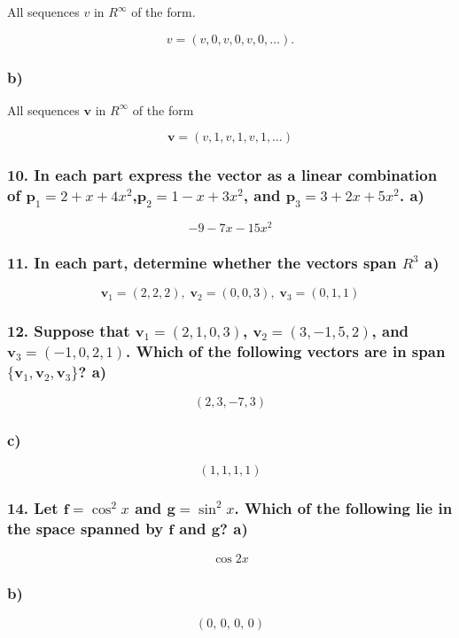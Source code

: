 \documentclass{article}
\begin{document}
All sequences $v$ in $R^{\infty}$ of the form.

\[ v = (v, 0, v, 0, v, 0, \ldots). \]
\vfill

\subsubsection*{ b) }

All sequences $\mathbf{v}$ in $R^{\infty}$ of the form

\[ \mathbf{v} = (v, 1, v, 1, v, 1, \ldots) \]
\vfill

\pagebreak
\subsubsection*{ 10. In each part express the vector as a linear combination of $\mathbf{p}_1 = 2 + x + 4x^2$,$ \mathbf{p}_2 = 1 - x + 3x^2$, and $\mathbf{p}_3 = 3 + 2x + 5x^2$. a) }

\[ -9-7x-15x^2 \]
\vfill

\subsubsection*{ 11. In each part, determine whether the vectors span $R^3$ a) }

\[ \mathbf{v}_1=(2,2,2),\; \mathbf{v}_2=(0,0,3),\; \mathbf{v}_3=(0,1,1) \]
\vfill

\pagebreak
\subsubsection*{ 12. Suppose that $\mathbf{v}_1 = (2, 1, 0, 3)$, $\mathbf{v}_2 = (3, -1, 5, 2)$, and $\mathbf{v}_3 = (-1, 0, 2, 1)$. Which of the following vectors are in span $\{\mathbf{v}_1, \mathbf{v}_2, \mathbf{v}_3\}$? a) }

\[ (2, 3, -7, 3) \]
\vfill

\subsubsection*{ c) }

\[ (1, 1, 1, 1) \]
\vfill

\pagebreak
\subsubsection*{ 14. Let $\mathbf{f} = \cos^2 x$ and $\mathbf{g} = \sin^2 x$. Which of the following lie in the space spanned by $\mathbf{f}$ and $\mathbf{g}$? a) }

\[ \cos 2x \]
\vfill

\subsubsection*{ b) }

\[ (0, \, 0, \, 0, \, 0) \]
\vfill

\pagebreak
\end{document}
